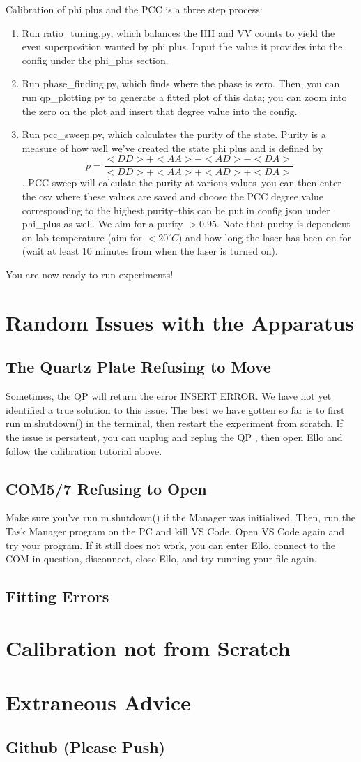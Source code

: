 \documentclass{paper}[11pt]
\begin{document}
Calibration of phi plus and the PCC is a three step process:
\begin{enumerate}
    \item Run ratio\_tuning.py, which balances the HH and VV counts to yield the even superposition wanted by phi plus. Input the value it provides into the config under the phi\_plus section.
    \item Run phase\_finding.py, which finds where the phase is zero. Then, you can run qp\_plotting.py to generate a fitted plot of this data; you can zoom into the zero on the plot and insert that degree value into the config. 
    \item Run pcc\_sweep.py, which calculates the purity of the state. Purity is a measure of how well we've created the state phi plus and is defined by $$p = \frac{<DD> + <AA> - <AD> - <DA>}{<DD> + <AA> + <AD> + <DA>}$$. PCC sweep will calculate the purity at various values--you can then enter the csv where these values are saved and choose the PCC degree value corresponding to the highest purity--this can be put in config.json under phi\_plus as well. We aim for a purity $>0.95$. Note that purity is dependent on lab temperature (aim for $<20^\circ C$) and how long the laser has been on for (wait at least 10 minutes from when the laser is turned on).
\end{enumerate}
You are now ready to run experiments! 

\section{Random Issues with the Apparatus}
\subsection{The Quartz Plate Refusing to Move}
Sometimes, the QP will return the error INSERT ERROR. We have not yet identified a true solution to this issue. The best we have gotten so far is to first run m.shutdown() in the terminal, then restart the experiment from scratch. If the issue is persistent, you can unplug and replug the QP , then open Ello and follow the calibration tutorial above. 
\subsection{COM5/7 Refusing to Open}
Make sure you've run m.shutdown() if the Manager was initialized. Then, run the Task Manager program on the PC and kill VS Code. Open VS Code again and try your program. If it still does not work, you can enter Ello, connect to the COM in question, disconnect, close Ello, and try running your file again. 
\subsection{Fitting Errors}
\section{Calibration not from Scratch}
\section{Extraneous Advice}
\subsection{Github (Please Push)}
\end{document}
